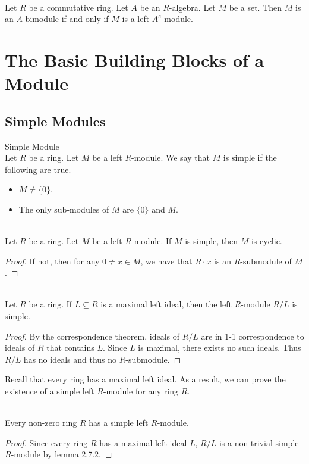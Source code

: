 \documentclass[a4paper]{article}
\begin{document}
\begin{lmm}{}{}\\
Let $R$ be a commutative ring. Let $A$ be an $R$-algebra. Let $M$ be a set. Then $M$ is an $A$-bimodule if and only if $M$ is a left $A^e$-module. 
\end{lmm}

\pagebreak
\section{The Basic Building Blocks of a Module}
\subsection{Simple Modules}
\begin{defn}{Simple Module}{}\\
Let $R$ be a ring. Let $M$ be a left $R$-module. We say that $M$ is simple if the following are true. 
\begin{itemize}
\item $M\neq\{0\}$. 
\item The only sub-modules of $M$ are $\{0\}$ and $M$. 
\end{itemize}
\end{defn}

\begin{lmm}{}{}\\
Let $R$ be a ring. Let $M$ be a left $R$-module. If $M$ is simple, then $M$ is cyclic. 
\begin{proof}
If not, then for any $0\neq x\in M$, we have that $R\cdot x$ is an $R$-submodule of $M$. 
\end{proof}
\end{lmm}

\begin{lmm}{}{}\\
Let $R$ be a ring. If $L\subseteq R$ is a maximal left ideal, then the left $R$-module $R/L$ is simple. 
\begin{proof}
By the correspondence theorem, ideals of $R/L$ are in 1-1 correspondence to ideals of $R$ that contains $L$. Since $L$ is maximal, there exists no such ideals. Thus $R/L$ has no ideals and thus no $R$-submodule. 
\end{proof}
\end{lmm}

Recall that every ring has a maximal left ideal. As a result, we can prove the existence of a simple left $R$-module for any ring $R$. 

\begin{crl}{}{}\\
Every non-zero ring $R$ has a simple left $R$-module. 
\begin{proof}
Since every ring $R$ has a maximal left ideal $L$, $R/L$ is a non-trivial simple $R$-module by lemma 2.7.2. 
\end{proof}
\end{crl}
\end{document}
